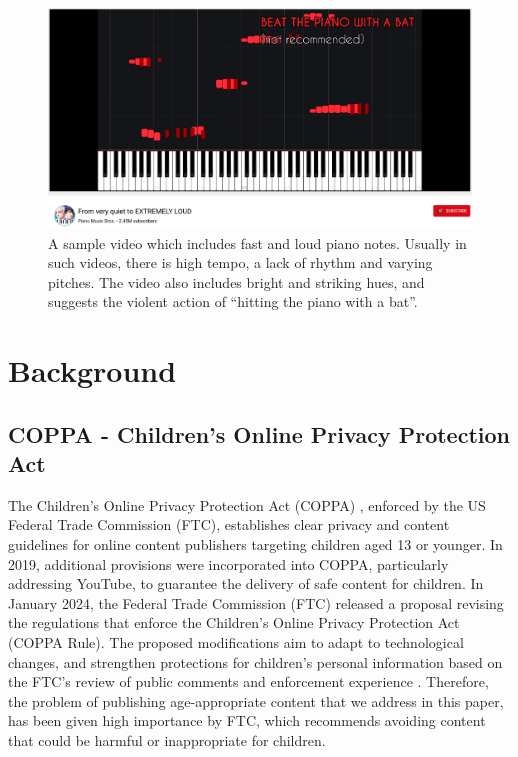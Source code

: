 \documentclass[letterpaper]{article}
\begin{document}
\begin{figure}[htp]
    \centering
    \includegraphics[width=0.85\columnwidth]{figures/malicious_audio.png}
    \caption{A sample video which includes fast and loud piano notes. Usually in such videos, there is high tempo, a lack of rhythm and varying pitches. The video also includes bright and striking hues, and suggests the violent action of ``hitting the piano with a bat''.}
    \label{fig:ytkpiano}
\end{figure}


\section{Background}\label{BG} 
\subsection{COPPA - Children's Online Privacy Protection Act} 
The Children's Online Privacy Protection Act (COPPA) \cite{COPPA1998}, enforced by the US Federal Trade Commission (FTC), establishes clear privacy and content guidelines for online content publishers targeting children aged 13 or younger. In 2019, additional provisions were incorporated into COPPA, particularly addressing YouTube, to guarantee the delivery of safe content for children. In January 2024, the Federal Trade Commission (FTC) released a proposal revising the regulations that enforce the Children's Online Privacy Protection Act (COPPA Rule). The proposed modifications aim to adapt to technological changes, and strengthen protections for children's personal information based on the FTC's review of public comments and enforcement experience \cite{FTC_2024}. Therefore, the problem of publishing age-appropriate content that we address in this paper, has been given high importance by FTC, which recommends avoiding content that could be harmful or inappropriate for children. 
\end{document}
